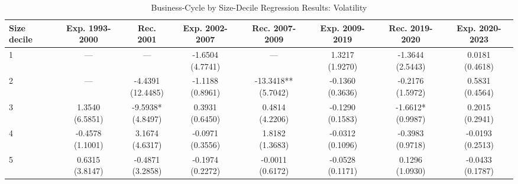 \begin{table}[!htbp]\centering
\caption{Business-Cycle by Size-Decile Regression Results: Volatility}
\label{tab:cycle_size_detailed_volatility}
\begin{threeparttable}
\footnotesize
\setlength{\tabcolsep}{3.2pt}
\renewcommand{\arraystretch}{1.04}
\begin{tabular}{@{}lccccccc@{}}
\toprule
Size decile & Exp. 1993-2000 & Rec. 2001 & Exp. 2002-2007 & Rec. 2007-2009 & Exp. 2009-2019 & Rec. 2019-2020 & Exp. 2020-2023 \\
\midrule
1 & — & — & \shortstack{-1.6504\\(4.7741)} & — & \shortstack{1.3217\\(1.9270)} & \shortstack{-1.3644\\(2.5443)} & \shortstack{0.0181\\(0.4618)} \\
2 & — & \shortstack{-4.4391\\(12.4485)} & \shortstack{-1.1188\\(0.8961)} & \shortstack{-13.3418**\\(5.7042)} & \shortstack{-0.1360\\(0.3636)} & \shortstack{-0.2176\\(1.5972)} & \shortstack{0.5831\\(0.4564)} \\
3 & \shortstack{1.3540\\(6.5851)} & \shortstack{-9.5938*\\(4.8497)} & \shortstack{0.3931\\(0.6450)} & \shortstack{0.4814\\(4.2206)} & \shortstack{-0.1290\\(0.1583)} & \shortstack{-1.6612*\\(0.9987)} & \shortstack{0.2015\\(0.2941)} \\
4 & \shortstack{-0.4578\\(1.1001)} & \shortstack{3.1674\\(4.6317)} & \shortstack{-0.0971\\(0.3556)} & \shortstack{1.8182\\(1.3683)} & \shortstack{-0.0312\\(0.1096)} & \shortstack{-0.3983\\(0.9718)} & \shortstack{-0.0193\\(0.2513)} \\
5 & \shortstack{0.6315\\(3.8147)} & \shortstack{-0.4871\\(3.2858)} & \shortstack{-0.1974\\(0.2272)} & \shortstack{-0.0011\\(0.6172)} & \shortstack{-0.0528\\(0.1171)} & \shortstack{0.1296\\(1.0930)} & \shortstack{-0.0433\\(0.1787)} \\

\end{tabular}
\end{threeparttable}
\end{table}
